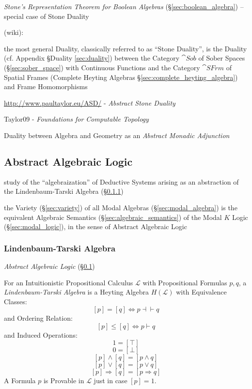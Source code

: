 \fist \emph{Stone's Representation Theorem for Boolean Algebras}
(\S\ref{sec:boolean_algebra}) -- special case of Stone Duality

(wiki):

the most general Duality, classically referred to as ``Stone Duality'', is the
Duality (cf. Appendix \S Duality \ref{sec:duality}) between the Category
$\cat{Sob}$ of Sober Spaces (\S\ref{sec:sober_space}) with Continuous Functions
and the Category $\cat{SFrm}$ of Spatial Frames (Complete Heyting Algebras
\S\ref{sec:complete_heyting_algebra}) and Frame Homomorphisms

\url{http://www.paultaylor.eu/ASD/} - \emph{Abstract Stone Duality}

Taylor09 - \emph{Foundations for Computable Topology}

Duality between Algebra and Geometry as an \emph{Abstract Monadic Adjunction}



\subsection{Abstract Algebraic Logic}\label{sec:abstract_algebraic_logic}

study of the ``algebraization'' of Deductive Systems arising as an abstraction
of the Lindenbaum-Tarski Algebra (\S\ref{sec:lindenbaum_tarski})

the Variety (\S\ref{sec:variety}) of all Modal Algebras
(\S\ref{sec:modal_algebra}) is the equivalent Algebraic Semantics
(\S\ref{sec:algebraic_semantics}) of the Modal $K$ Logic
(\S\ref{sec:modal_logic}), in the sense of Abstract Algebraic Logic



\subsubsection{Lindenbaum-Tarski Algebra}\label{sec:lindenbaum_tarski}

\emph{Abstract Algebraic Logic} (\S\ref{sec:abstract_algebraic_logic})

\cite{awodey06}
For an Intuitionistic Propositional Calculus $\mathcal{L}$ with
Propositional Formulas $p,q$, a \emph{Lindenbaum-Tarski Algebra} is a
Heyting Algebra $H(\mathcal{L})$ with Equivalence Classes:
\[
  [p] = [q] \Leftrightarrow p \dashv \vdash q
\]
and Ordering Relation:
\[
  [p] \leq [q] \Leftrightarrow p \vdash q
\]
and Induced Operations:
\[
  1 = [\top]
\]\[
  0 = [\bot]
\]\[
  [p] \wedge [q] = [p \wedge q]
\]\[
  [p] \vee [q] = [p \vee q]
\]\[
  [p] \Rightarrow [q] = [p \Rightarrow q]
\]
A Formula $p$ is Provable in $\mathcal{L}$ just in case $[p] = 1$.

